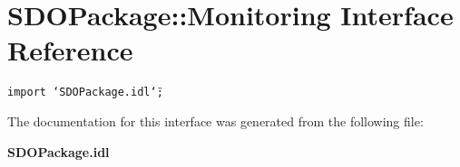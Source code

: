 \section{SDOPackage::Monitoring Interface Reference}
\label{interfaceSDOPackage_1_1Monitoring}
{\tt import \char`\"{}SDOPackage.idl\char`\"{};}



The documentation for this interface was generated from the following file:\begin{CompactItemize}
\item 
{\bf SDOPackage.idl}\end{CompactItemize}
